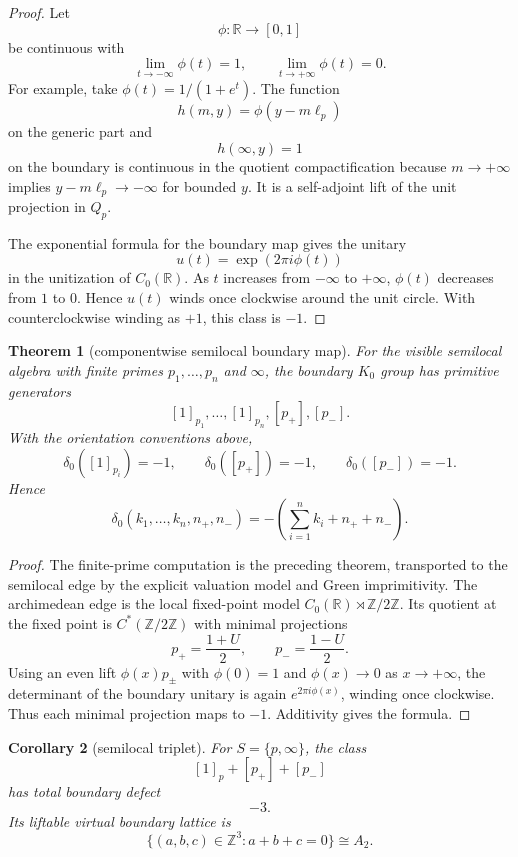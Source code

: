 \documentclass[11pt]{article}
\newtheorem{theorem}{Theorem}[section]
\newtheorem{corollary}[theorem]{Corollary}
\theoremstyle{remark}
\newcommand{\ZZ}{\mathbb Z}
\newcommand{\RR}{\mathbb R}
\begin{document}
\begin{proof}
Let
\[
        \phi:\RR\to[0,1]
\]
be continuous with
\[
        \lim_{t\to-\infty}\phi(t)=1,
        \qquad
        \lim_{t\to+\infty}\phi(t)=0.
\]
For example, take $\phi(t)=1/(1+e^t)$.  The function
\[
        h(m,y)=\phi(y-m\ell_p)
\]
on the generic part and
\[
        h(\infty,y)=1
\]
on the boundary is continuous in the quotient compactification because $m\to+\infty$ implies $y-m\ell_p\to-\infty$ for bounded $y$.  It is a self-adjoint lift of the unit projection in $Q_p$.

The exponential formula for the boundary map gives the unitary
\[
        u(t)=\exp(2\pi i\phi(t))
\]
in the unitization of $C_0(\RR)$.  As $t$ increases from $-\infty$ to $+\infty$, $\phi(t)$ decreases from $1$ to $0$.  Hence $u(t)$ winds once clockwise around the unit circle.  With counterclockwise winding as $+1$, this class is $-1$.\end{proof}

\begin{theorem}[componentwise semilocal boundary map]
For the visible semilocal algebra with finite primes $p_1,\ldots,p_n$ and $\infty$, the boundary $K_0$ group has primitive generators
\[
        [1]_{p_1},\ldots,[1]_{p_n},[p_+],[p_-].
\]
With the orientation conventions above,
\[
        \delta_0([1]_{p_i})=-1,
        \qquad
        \delta_0([p_+])=-1,
        \qquad
        \delta_0([p_-])=-1.
\]
Hence
\[
        \delta_0(k_1,\ldots,k_n,n_+,n_-)
        =-\left(\sum_{i=1}^n k_i+n_++n_-\right).
\]
\end{theorem}

\begin{proof}
The finite-prime computation is the preceding theorem, transported to the semilocal edge by the explicit valuation model and Green imprimitivity.  The archimedean edge is the local fixed-point model $C_0(\RR)\rtimes\ZZ/2\ZZ$.  Its quotient at the fixed point is $C^*(\ZZ/2\ZZ)$ with minimal projections
\[
        p_+=\frac{1+U}{2},
        \qquad
        p_-=\frac{1-U}{2}.
\]
Using an even lift $\phi(x)p_\pm$ with $\phi(0)=1$ and $\phi(x)\to0$ as $x\to+\infty$, the determinant of the boundary unitary is again $e^{2\pi i\phi(x)}$, winding once clockwise.  Thus each minimal projection maps to $-1$.  Additivity gives the formula.\end{proof}

\begin{corollary}[semilocal triplet]
For $S=\{p,\infty\}$, the class
\[
        [1]_p+[p_+]+[p_-]
\]
has total boundary defect
\[
        -3.
\]
Its liftable virtual boundary lattice is
\[
        \{(a,b,c)\in\ZZ^3:a+b+c=0\}\cong A_2.
\]
\end{corollary}
\end{document}
